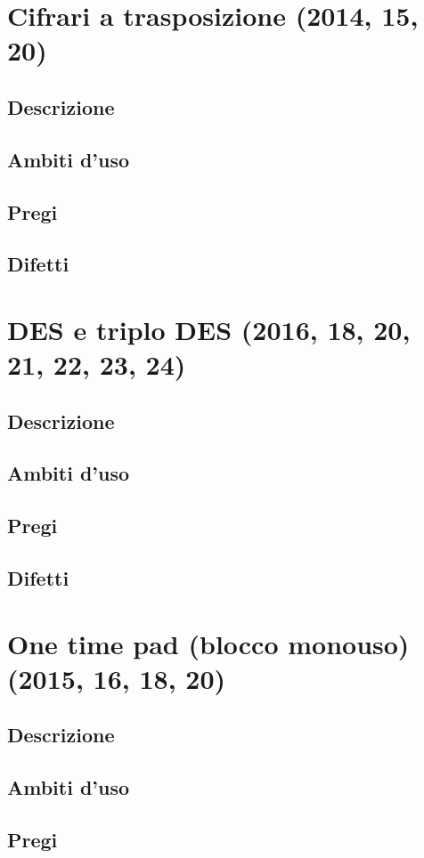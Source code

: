 \documentclass[10pt,oneside,a4paper]{article}
\begin{document}
\section{Cifrari a trasposizione (2014, 15, 20)}
\subsection{Descrizione}
\subsection{Ambiti d'uso}
\subsection{Pregi}
\subsection{Difetti}
\section{DES e triplo DES (2016, 18, 20, 21, 22, 23, 24)}
\subsection{Descrizione}
\subsection{Ambiti d'uso}
\subsection{Pregi}
\subsection{Difetti}
\section{One time pad (blocco monouso) (2015, 16, 18, 20)}
\subsection{Descrizione}
\subsection{Ambiti d'uso}
\subsection{Pregi}
\end{document}
